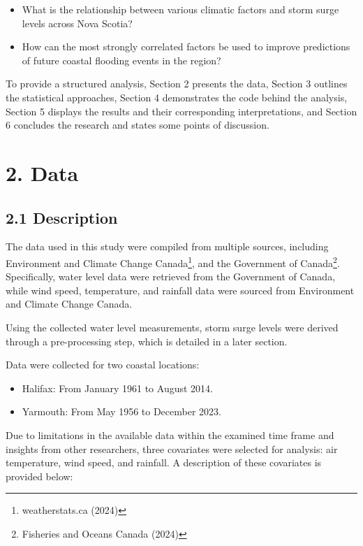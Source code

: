 \documentclass[
  letterpaper,
  DIV=11,
  numbers=noendperiod]{scrartcl}
\begin{document}
\begin{itemize}
\item
  What is the relationship between various climatic factors and storm
  surge levels across Nova Scotia?
\item
  How can the most strongly correlated factors be used to improve
  predictions of future coastal flooding events in the region?
\end{itemize}

To provide a structured analysis, Section 2 presents the data, Section 3
outlines the statistical approaches, Section 4 demonstrates the code
behind the analysis, Section 5 displays the results and their
corresponding interpretations, and Section 6 concludes the research and
states some points of discussion.

\section{2. Data}\label{data}

\subsection{2.1 Description}\label{description}

The data used in this study were compiled from multiple sources,
including Environment and Climate Change Canada\footnote{weatherstats.ca
  (2024)}, and the Government of Canada\footnote{Fisheries and Oceans
  Canada (2024)}. Specifically, water level data were retrieved from the
Government of Canada, while wind speed, temperature, and rainfall data
were sourced from Environment and Climate Change Canada.

Using the collected water level measurements, storm surge levels were
derived through a pre-processing step, which is detailed in a later
section.

Data were collected for two coastal locations:

\begin{itemize}
\item
  Halifax: From January 1961 to August 2014.
\item
  Yarmouth: From May 1956 to December 2023.
\end{itemize}

Due to limitations in the available data within the examined time frame
and insights from other researchers, three covariates were selected for
analysis: air temperature, wind speed, and rainfall. A description of
these covariates is provided below:
\end{document}
